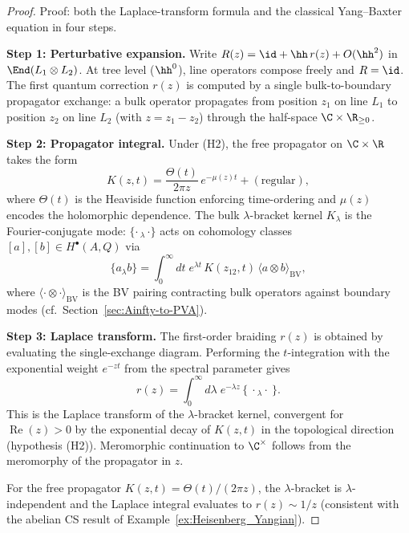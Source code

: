 \begin{proof}
Proof: both the Laplace-transform formula and the classical Yang--Baxter equation in four steps.

\medskip
\noindent\textbf{Step 1: Perturbative expansion.}
Write $R(z) = \id + \hh\, r(z) + O(\hh^2)$ in $\End(L_1 \otimes L_2)$. At tree level ($\hh^0$), line operators compose freely and $R = \id$. The first quantum correction $r(z)$ is computed by a single bulk-to-boundary propagator exchange: a bulk operator propagates from position $z_1$ on line $L_1$ to position $z_2$ on line $L_2$ (with $z = z_1 - z_2$) through the half-space $\C \times \R_{\geq 0}$.

\medskip
\noindent\textbf{Step 2: Propagator integral.}
Under (H2), the free propagator on $\C \times \R$ takes the form
\[
K(z,t) = \frac{\Theta(t)}{2\pi z}\, e^{-\mu(z) t} + (\text{regular}),
\]
where $\Theta(t)$ is the Heaviside function enforcing time-ordering and $\mu(z)$ encodes the holomorphic dependence. The bulk $\lambda$-bracket kernel $K_\lambda$ is the Fourier-conjugate mode: $\{\cdot\,{}_\lambda\,\cdot\}$ acts on cohomology classes $[a], [b] \in H^\bullet(A,Q)$ via
\[
\{a_\lambda b\} = \int_0^\infty dt\; e^{\lambda t}\, K(z_{12}, t)\, \langle a \otimes b \rangle_{\mathrm{BV}},
\]
where $\langle \cdot \otimes \cdot \rangle_{\mathrm{BV}}$ is the BV pairing contracting bulk operators against boundary modes (cf.\ Section~\ref{sec:Ainfty-to-PVA}).

\medskip
\noindent\textbf{Step 3: Laplace transform.}
The first-order braiding $r(z)$ is obtained by evaluating the single-exchange diagram. Performing the $t$-integration with the exponential weight $e^{-zt}$ from the spectral parameter gives
\[
r(z) = \int_0^\infty d\lambda\; e^{-\lambda z}\, \{\ \cdot{}_\lambda \cdot\ \}.
\]
This is the Laplace transform of the $\lambda$-bracket kernel, convergent for $\operatorname{Re}(z) > 0$ by the exponential decay of $K(z,t)$ in the topological direction (hypothesis (H2)). Meromorphic continuation to $\C^\times$ follows from the meromorphy of the propagator in $z$.

For the free propagator $K(z,t) = \Theta(t)/(2\pi z)$, the $\lambda$-bracket is $\lambda$-independent and the Laplace integral evaluates to $r(z) \sim 1/z$ (consistent with the abelian CS result of Example~\ref{ex:Heisenberg_Yangian}).


\end{proof}
